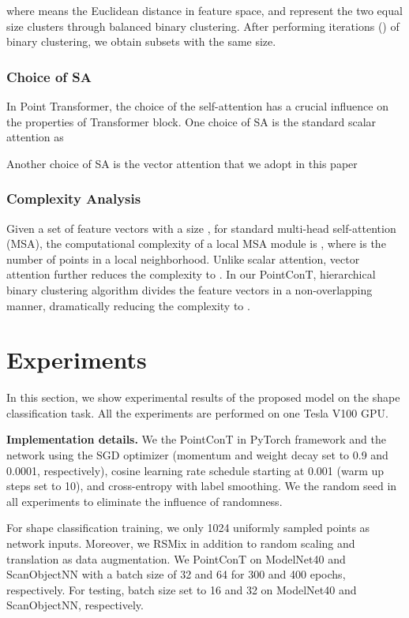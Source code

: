 \documentclass[lettersize,journal]{IEEEtran}
\begin{document}
where  means the Euclidean distance in feature space,  and  represent the two equal size clusters through balanced binary clustering. 
After performing  iterations () of binary clustering, we obtain  subsets with the same size.


\subsubsection*{\bf Choice of SA\label{sec:SA}} 
In Point Transformer, the choice of the self-attention has a crucial influence on the properties of Transformer block. 
One choice of SA is the standard scalar attention as 


Another choice of SA is the vector attention\cite{pointtransformer,vectorattention} that we adopt in this paper


\subsubsection*{\bf Complexity Analysis} Given a set of feature vectors with a size , for standard multi-head self-attention (MSA), 
the computational complexity of a local MSA module is , where  is the number of points in a local neighborhood.
Unlike scalar attention, vector attention further reduces the complexity to . 
In our PointConT, hierarchical binary clustering algorithm divides the feature vectors in a non-overlapping manner, dramatically reducing the complexity to .





\section{Experiments}
In this section, we show experimental results of the proposed model on the shape classification task. All the experiments 
are performed on one Tesla V100 GPU.

\noindent\textbf{Implementation details.}
We  the PointConT in PyTorch framework and  the network using the SGD optimizer (momentum and weight decay set to 0.9 and 0.0001, respectively),
cosine learning rate schedule starting at 0.001 (warm up steps set to 10), 
and cross-entropy with label smoothing. 
We  the random seed in all experiments to eliminate the influence of randomness.


For shape classification training, we only  1024 uniformly sampled points as network inputs. Moreover, we  RSMix\cite{rsmix} in addition to random scaling and translation as data augmentation. 
We  PointConT on ModelNet40 and ScanObjectNN with a batch size of 32 and 64 for 300 and 400 epochs, respectively.
For testing, batch size  set to 16 and 32 on ModelNet40 and ScanObjectNN, respectively. 
\end{document}
